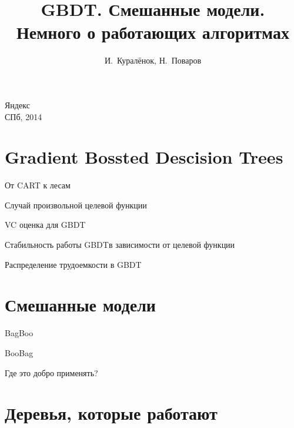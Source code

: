 \documentclass[14pt, fleqn, xcolor={dvipsnames, table}]{beamer}
\title{GBDT. Смешанные модели. \\\small{Немного о работающих алгоритмах}}
\author[]{\small{%
И.~Куралёнок,
Н.~Поваров}}
\date{}
\begin{document}
\begin{frame}
\maketitle
\small
\begin{center}
\vspace{-60pt}
\normalsize {\color{red}Я}ндекс \\
\vspace{80pt}
\footnotesize СПб, 2014
\end{center}
\end{frame}

\section{Gradient Bossted Descision Trees}
\begin{frame}{От CART к лесам}
\end{frame}

\begin{frame}{Случай произвольной целевой функции}
\end{frame}

\begin{frame}{VC оценка для GBDT}
\end{frame}

\begin{frame}{Стабильность работы GBDT}{в зависимости от целевой функции}
\end{frame}

\begin{frame}{Распределение трудоемкости в GBDT}
\end{frame}

\section{Смешанные модели}

\begin{frame}{BagBoo}
\end{frame}

\begin{frame}{BooBag}
\end{frame}

\begin{frame}{Где это добро применять?}
\end{frame}

\section{Деревья, которые работают}
\end{document}
